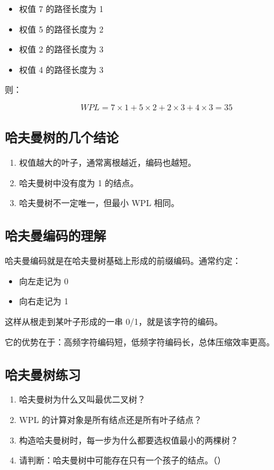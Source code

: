 \documentclass{../../note}
\begin{document}
\begin{itemize}
  \item 权值 7 的路径长度为 1
  \item 权值 5 的路径长度为 2
  \item 权值 2 的路径长度为 3
  \item 权值 4 的路径长度为 3
\end{itemize}

则：

\[
WPL = 7 \times 1 + 5 \times 2 + 2 \times 3 + 4 \times 3 = 35
\]

\subsection{哈夫曼树的几个结论}

\begin{enumerate}
  \item 权值越大的叶子，通常离根越近，编码也越短。
  \item 哈夫曼树中没有度为 1 的结点。
  \item 哈夫曼树不一定唯一，但最小 WPL 相同。
\end{enumerate}

\subsection{哈夫曼编码的理解}

哈夫曼编码就是在哈夫曼树基础上形成的前缀编码。通常约定：

\begin{itemize}
  \item 向左走记为 0
  \item 向右走记为 1
\end{itemize}

这样从根走到某叶子形成的一串 0/1，就是该字符的编码。

它的优势在于：高频字符编码短，低频字符编码长，总体压缩效率更高。

\subsection{哈夫曼树练习}

\begin{enumerate}
  \item 哈夫曼树为什么又叫最优二叉树？
  \item WPL 的计算对象是所有结点还是所有叶子结点？
  \item 构造哈夫曼树时，每一步为什么都要选权值最小的两棵树？
  \item 请判断：哈夫曼树中可能存在只有一个孩子的结点。（\hspace{1cm}）
\end{enumerate}
\end{document}
